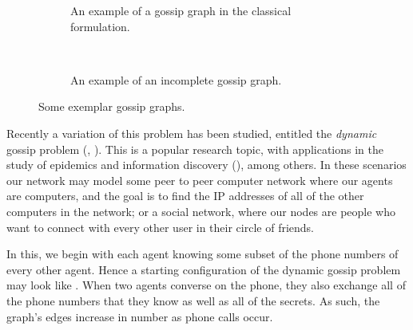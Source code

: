 \documentclass[ %
                    author={Leo Poulson},
                supervisor={Dr. Steven Ramsay},
                    degree={BSc},
                     title={Epistemic Planning for the Dynamic Gossip problem},
                  subtitle={},
                      year={2019} ]{dissertation}
\begin{document}
\begin{figure}[h]
  \centering
  \begin{subfigure}[c]{0.4\textwidth}
    \centering
    \caption{An example of a gossip graph in the classical formulation.}
    \label{fig:classicgossipex}
  \end{subfigure}%
  ~
  \begin{subfigure}[c] {0.4\textwidth}
    \centering
    \caption{An example of an incomplete gossip graph. }
    \label{fig:dynamicgossipex}

  \end{subfigure}
  \caption{Some exemplar gossip graphs.}
\end{figure}

Recently a variation of this problem has been studied, entitled the
\emph{dynamic} gossip problem (\cite{DynamicGossip}, \cite{EpProforDyGo}). This
is a popular research topic, with applications in the study of epidemics and
information discovery (\cite{DiscoverythruGossip}), among others. In these
scenarios our network may model some peer to peer computer network where our
agents are computers, and the goal is to find the IP addresses of all of the
other computers in the network; or a social network, where our nodes are people
who want to connect with every other user in their circle of friends.

In this, we begin with each agent knowing some subset of the phone
numbers of every other agent. Hence a starting configuration of the dynamic
gossip problem may look like . When two agents
converse on the phone, they also exchange all of the phone numbers that they
know as well as all of the secrets. As such, the graph's edges increase in
number as phone calls occur.
\end{document}
